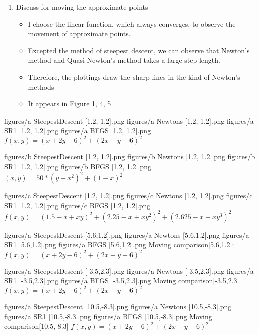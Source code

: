 \documentclass{standalone}
\begin{document}
\begin{enumerate}
\item Discuss for moving the approximate points
\begin{itemize}
  \item I choose the linear function, which always converges, to observe the movement of approximate points.
  \item Excepted the method of steepest descent, we can observe that Newton's method and Quasi-Newton's method takes a large step length.
  \item Therefore, the plottings draw the sharp lines in the kind of Newton's methods
  \item It appears in Figure 1, 4, 5
\end{itemize}
\end{enumerate}
\insertfigures
{figures/a SteepestDescent [1.2, 1.2].png}
{figures/a Newtons [1.2, 1.2].png}
{figures/a SR1 [1.2, 1.2].png}
{figures/a BFGS [1.2, 1.2].png}
{$f(x, y)=(x+2y-6)^2 + (2x+y-6)^2$}

\insertfigures
{figures/b SteepestDescent [1.2, 1.2].png}
{figures/b Newtons [1.2, 1.2].png}
{figures/b SR1 [1.2, 1.2].png}
{figures/b BFGS [1.2, 1.2].png}
{$(x, y)=50*(y-x^2)^2 + (1-x)^2$}

\insertfigures
{figures/c SteepestDescent [1.2, 1.2].png}
{figures/c Newtons [1.2, 1.2].png}
{figures/c SR1 [1.2, 1.2].png}
{figures/c BFGS [1.2, 1.2].png}
{$f(x, y)=(1.5-x+xy)^2 + (2.25-x+xy^2)^2 + (2.625 - x+ xy^3)^2$}

\insertfigures
{figures/a SteepestDescent [5.6,1.2].png}
{figures/a Newtons [5.6,1.2].png}
{figures/a SR1 [5.6,1.2].png}
{figures/a BFGS [5.6,1.2].png}
{Moving comparison[5.6,1.2]: $f(x, y)=(x+2y-6)^2 + (2x+y-6)^2$}

\insertfigures
{figures/a SteepestDescent [-3.5,2.3].png}
{figures/a Newtons [-3.5,2.3].png}
{figures/a SR1 [-3.5,2.3].png}
{figures/a BFGS [-3.5,2.3].png}
{Moving comparison[-3.5,2.3] $f(x, y)=(x+2y-6)^2 + (2x+y-6)^2$}

\insertfigures
{figures/a SteepestDescent [10.5,-8.3].png}
{figures/a Newtons [10.5,-8.3].png}
{figures/a SR1 [10.5,-8.3].png}
{figures/a BFGS [10.5,-8.3].png}
{Moving comparison[10.5,-8.3] $f(x, y)=(x+2y-6)^2 + (2x+y-6)^2$}
\end{document}
